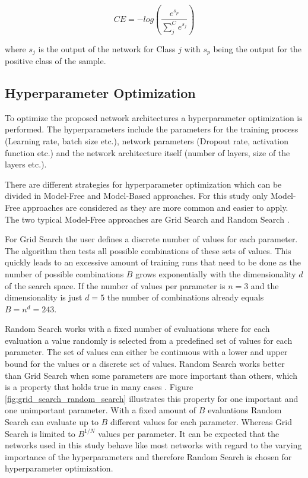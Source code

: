 \documentclass[conference]{IEEEtran}
\begin{document}
\begin{equation}
	\label{eq:categorical-cross-entrophy}
	CE = -log(\frac{e^{s_p}}{\sum_{j}^{C} e^{s_j}})	
\end{equation}

where $ s_j $ is the output of the network for Class $ j $ with $ s_p $ being the output for the positive class of the sample.

\subsection{Hyperparameter Optimization}
\label{sec:hyperparameter_optimization_method}

To optimize the proposed network architectures a hyperparameter optimization is performed. The hyperparameters include the parameters for the training process (Learning rate, batch size etc.), network parameters (Dropout rate, activation function etc.) and the network architecture itself (number of layers, size of the layers etc.).

There are different strategies for hyperparameter optimization which can be divided in Model-Free and Model-Based approaches. For this study only Model-Free approaches are considered as they are more common and easier to apply. The two typical Model-Free approaches are Grid Search and Random Search \cite{Feurer2019}. 

For Grid Search the user defines a discrete number of values for each parameter. The algorithm then tests all possible combinations of these sets of values. This quickly leads to an excessive amount of training runs that need to be done as the number of possible combinations $ B $ grows exponentially with the dimensionality $ d $ of the search space. If the number of values per parameter is $ n = 3 $ and the dimensionality is just $ d = 5 $ the number of combinations already equals $ B = n^d = 243 $.

Random Search works with a fixed number of evaluations where for each evaluation a value randomly is selected from a predefined set of values for each parameter. The set of values can either be continuous with a lower and upper bound for the values or a discrete set of values. Random Search works better than Grid Search when some parameters are more important than others, which is a property that holds true in many cases \cite{Feurer2019}. Figure \ref{fig:grid_search_random_search} illustrates this property for one important and one unimportant parameter. With a fixed amount of $ B $ evaluations Random Search can evaluate up to $ B $ different values for each parameter. Whereas Grid Search is limited to $ B^{1/N} $ values per parameter. It can be expected that the networks used in this study behave like most networks with regard to the varying importance of the hyperparameters and therefore Random Search is chosen for hyperparameter optimization.
\end{document}
